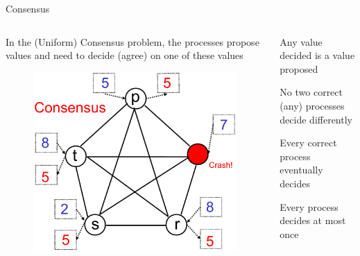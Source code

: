 \begin{frame}{Consensus}
	
\begin{columns}
	
\begin{column}{0.45\textwidth}
In the \alert{(Uniform) Consensus} problem, the processes \alert{propose}
values and need to \alert{decide} (agree) on one of these values
\begin{figure}
\includegraphics[width=\textwidth]{figs/04/rb-consensus}
\end{figure}

\end{column}

\begin{column}{0.55\textwidth}
\begin{definition}
Any value decided is a value proposed
\end{definition} 
\begin{definition}
No two correct (any) processes decide differently 
\end{definition} 
\begin{definition}[Termination]
Every correct process eventually decides
\end{definition} 
\begin{definition}
Every process decides at most once
\end{definition} 
\end{column}
\end{columns}

	
\end{frame}

